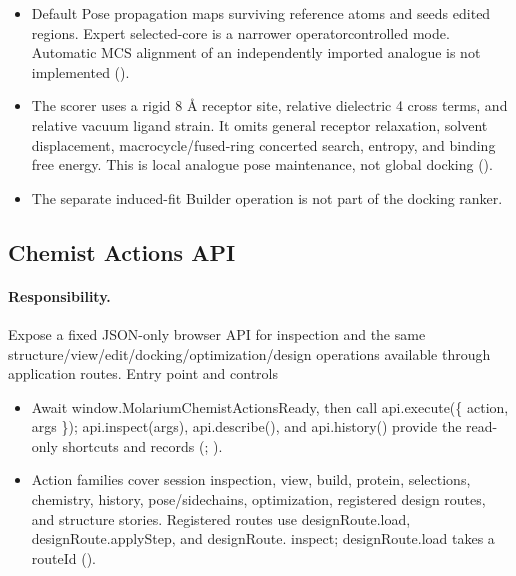 \documentclass[11pt]{article}
\begin{document}
\begin{small}
\begin{itemize}[leftmargin=*]
\item Default Pose propagation maps surviving reference atoms and seeds edited regions. Expert selected-core is a narrower operatorcontrolled mode. Automatic MCS alignment of an independently imported analogue is not implemented ().

\item The scorer uses a rigid 8 \AA{} receptor site, relative dielectric 4 cross terms, and relative vacuum ligand strain. It omits general receptor relaxation, solvent displacement, macrocycle/fused-ring concerted search, entropy, and binding free energy. This is local analogue pose maintenance, not global docking ().

\item The separate induced-fit Builder operation is not part of the docking ranker.

\end{itemize}

\subsection{Chemist Actions API}\label{appB:sec18}

\paragraph{Responsibility.}

Expose a fixed JSON-only browser API for inspection and the same structure/view/edit/docking/optimization/design operations available through application routes. Entry point and controls

\begin{itemize}[leftmargin=*]

\item Await window.MolariumChemistActionsReady, then call api.execute(\{ action, args \}); api.inspect(args), api.describe(), and api.history() provide the read-only shortcuts and records (; ).

\item Action families cover session inspection, view, build, protein, selections, chemistry, history, pose/sidechains, optimization, registered design routes, and structure stories. Registered routes use designRoute.load, designRoute.applyStep, and designRoute. inspect; designRoute.load takes a routeId ().


\end{itemize}
\end{small}
\end{document}
